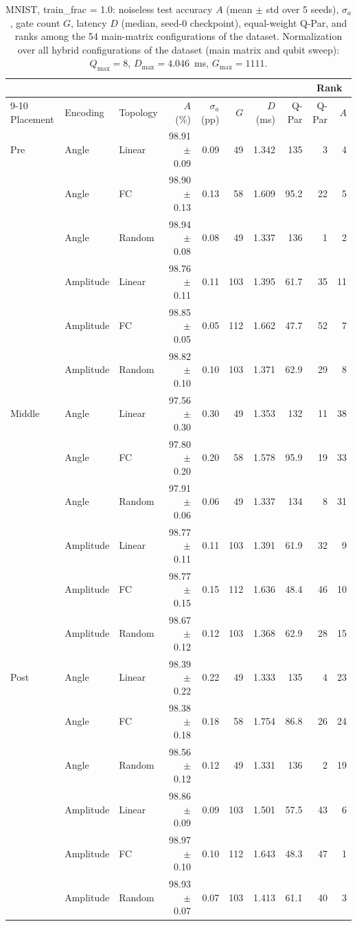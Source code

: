 \begin{table}[!t]
\centering
\caption{MNIST, train\_frac = 1.0: noiseless test accuracy $A$ (mean $\pm$ std over 5 seeds), $\sigma_a$, gate count $G$, latency $D$ (median, seed-0 checkpoint), equal-weight Q-Par, and ranks among the 54 main-matrix configurations of the dataset. Normalization over all hybrid configurations of the dataset (main matrix and qubit sweep): $Q_{\max} = 8$, $D_{\max} = 4.046$~ms, $G_{\max} = 1111$.}
\label{tab:mnist_tf1}
\footnotesize
\begin{tabular}{lllrrrrrrr}
\toprule
 &  &  &  &  &  &  &  & \multicolumn{2}{c}{Rank} \\
\cmidrule(lr){9-10}
Placement & Encoding & Topology & $A$ (\%) & $\sigma_a$ (pp) & $G$ & $D$ (ms) & Q-Par & Q-Par & $A$ \\
\midrule
Pre & Angle & Linear & 98.91 $\pm$ 0.09 & 0.09 & 49 & 1.342 & 135 & 3 & 4 \\
 & Angle & FC & 98.90 $\pm$ 0.13 & 0.13 & 58 & 1.609 & 95.2 & 22 & 5 \\
 & Angle & Random & 98.94 $\pm$ 0.08 & 0.08 & 49 & 1.337 & 136 & 1 & 2 \\
 & Amplitude & Linear & 98.76 $\pm$ 0.11 & 0.11 & 103 & 1.395 & 61.7 & 35 & 11 \\
 & Amplitude & FC & 98.85 $\pm$ 0.05 & 0.05 & 112 & 1.662 & 47.7 & 52 & 7 \\
 & Amplitude & Random & 98.82 $\pm$ 0.10 & 0.10 & 103 & 1.371 & 62.9 & 29 & 8 \\
\midrule
Middle & Angle & Linear & 97.56 $\pm$ 0.30 & 0.30 & 49 & 1.353 & 132 & 11 & 38 \\
 & Angle & FC & 97.80 $\pm$ 0.20 & 0.20 & 58 & 1.578 & 95.9 & 19 & 33 \\
 & Angle & Random & 97.91 $\pm$ 0.06 & 0.06 & 49 & 1.337 & 134 & 8 & 31 \\
 & Amplitude & Linear & 98.77 $\pm$ 0.11 & 0.11 & 103 & 1.391 & 61.9 & 32 & 9 \\
 & Amplitude & FC & 98.77 $\pm$ 0.15 & 0.15 & 112 & 1.636 & 48.4 & 46 & 10 \\
 & Amplitude & Random & 98.67 $\pm$ 0.12 & 0.12 & 103 & 1.368 & 62.9 & 28 & 15 \\
\midrule
Post & Angle & Linear & 98.39 $\pm$ 0.22 & 0.22 & 49 & 1.333 & 135 & 4 & 23 \\
 & Angle & FC & 98.38 $\pm$ 0.18 & 0.18 & 58 & 1.754 & 86.8 & 26 & 24 \\
 & Angle & Random & 98.56 $\pm$ 0.12 & 0.12 & 49 & 1.331 & 136 & 2 & 19 \\
 & Amplitude & Linear & 98.86 $\pm$ 0.09 & 0.09 & 103 & 1.501 & 57.5 & 43 & 6 \\
 & Amplitude & FC & 98.97 $\pm$ 0.10 & 0.10 & 112 & 1.643 & 48.3 & 47 & 1 \\
 & Amplitude & Random & 98.93 $\pm$ 0.07 & 0.07 & 103 & 1.413 & 61.1 & 40 & 3 \\
\bottomrule
\end{tabular}
\end{table}
